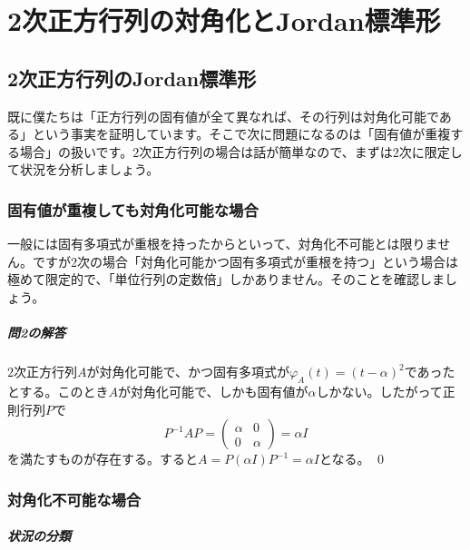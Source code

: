 \chapter{2次正方行列の対角化とJordan標準形}

\section{2次正方行列のJordan標準形}

既に僕たちは「正方行列の固有値が全て異なれば、その行列は対角化可能である」という事実を証明しています。そこで次に問題になるのは「固有値が重複する場合」の扱いです。$2$次正方行列の場合は話が簡単なので、まずは$2$次に限定して状況を分析しましょう。

\subsection{固有値が重複しても対角化可能な場合}

一般には固有多項式が重根を持ったからといって、対角化不可能とは限りません。ですが$2$次の場合「対角化可能かつ固有多項式が重根を持つ」という場合は極めて限定的で、「単位行列の定数倍」しかありません。そのことを確認しましょう。

\paragraph{問2の解答} $2$次正方行列$A$が対角化可能で、かつ固有多項式が$\varphi_A(t) = (t - \alpha)^2$であったとする。このとき$A$が対角化可能で、しかも固有値が$\alpha$しかない。したがって正則行列$P$で
\[
P^{-1} A P = 
\begin{pmatrix}
\alpha & 0 \\
0 & \alpha
\end{pmatrix}
= \alpha I
\]
を満たすものが存在する。すると$A = P (\alpha I) P^{-1} = \alpha I$となる。 \qed

\subsection{対角化不可能な場合}

\paragraph{状況の分類}

